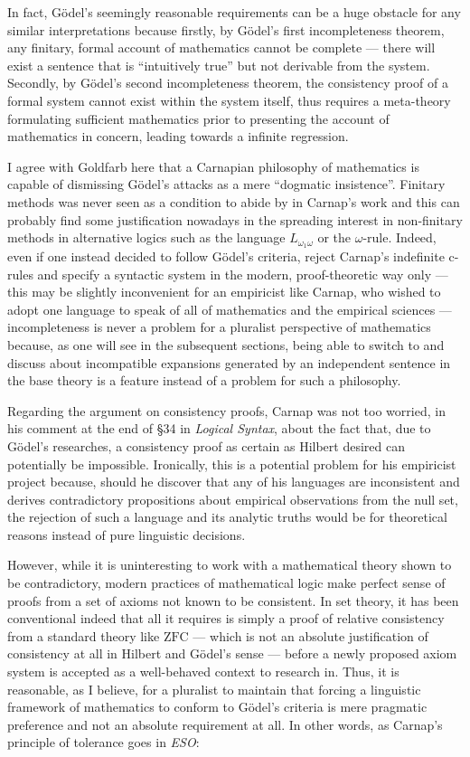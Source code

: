 \documentclass[12pt]{article}
\theoremstyle{plain}
\theoremstyle{definition}
\newcommand{\ZFC}{\mathrm{ZFC}}
\begin{document}
In fact, G\"odel's seemingly reasonable requirements can be a huge obstacle for any similar interpretations because firstly, by G\"odel's first incompleteness theorem, any finitary, formal account of mathematics cannot be complete --- there will exist a sentence that is ``intuitively true'' but not derivable from the system. Secondly, by G\"odel's second incompleteness theorem, the consistency proof of a formal system cannot exist within the system itself, thus requires a meta-theory formulating sufficient mathematics prior to presenting the account of mathematics in concern, leading towards a infinite regression.

I agree with Goldfarb here that a Carnapian philosophy of mathematics is capable of dismissing G\"odel's attacks as a mere ``dogmatic insistence''. Finitary methods was never seen as a condition to abide by in Carnap's work and this can probably find some justification nowadays in the spreading interest in non-finitary methods in alternative logics such as the language $L_{\omega_1\omega}$ or the $\omega$-rule. Indeed, even if one instead decided to follow G\"odel's criteria, reject Carnap's indefinite c-rules and specify a syntactic system in the modern, proof-theoretic way only --- this may be slightly inconvenient for an empiricist like Carnap, who wished to adopt one language to speak of all of mathematics and the empirical sciences --- incompleteness is never a problem for a pluralist perspective of mathematics because, as one will see in the subsequent sections, being able to switch to and discuss about incompatible expansions generated by an independent sentence in the base theory is a feature instead of a problem for such a philosophy.

Regarding the argument on consistency proofs, Carnap was not too worried, in his comment at the end of \S 34 in \emph{Logical Syntax}, about the fact that, due to G\"odel's researches, a consistency proof as certain as Hilbert desired can potentially be impossible. Ironically, this is a potential problem for his empiricist project because, should he discover that any of his languages are inconsistent and derives contradictory propositions about empirical observations from the null set, the rejection of such a language and its analytic truths would be for theoretical reasons instead of pure linguistic decisions.

However, while it is uninteresting to work with a mathematical theory shown to be contradictory, modern practices of mathematical logic make perfect sense of proofs from a set of axioms not known to be consistent. In set theory, it has been conventional indeed that all it requires is simply a proof of relative consistency from a standard theory like $\ZFC$ --- which is not an absolute justification of consistency at all in Hilbert and G\"odel's sense --- before a newly proposed axiom system is accepted as a well-behaved context to research in. Thus, it is reasonable, as I believe, for a pluralist to maintain that forcing a linguistic framework of mathematics to conform to G\"odel's criteria is mere pragmatic preference and not an absolute requirement at all. In other words, as Carnap's principle of tolerance goes in \emph{ESO}:
\end{document}
